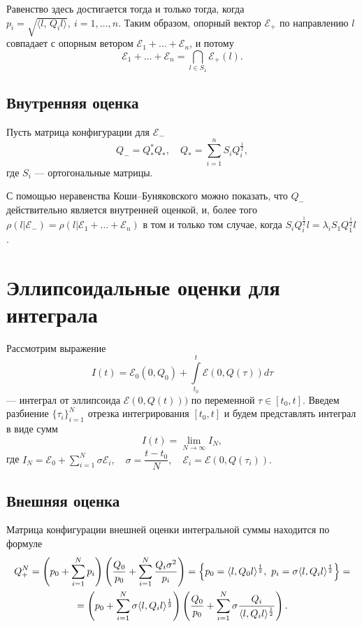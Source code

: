 \documentclass[16pt]{article}
\newcommand\Sum[2]{\sum\limits_{#1}^{#2}}
\newcommand\Scal[2]{\langle #1,\, #2 \rangle}
\begin{document}
Равенство здесь достигается тогда и только тогда, когда $p_i = \sqrt{\Scal{l}{Q_il}},\ i = 1, \ldots, n$. Таким образом, опорный вектор $\mathcal{E}_+$ по направлению $l$ совпадает с опорным ветором $\mathcal{E}_1 + \ldots + \mathcal{E}_n$, и потому
$$ \mathcal{E}_1 + \ldots + \mathcal{E}_n = \bigcap_{l \in S_1} \mathcal{E}_+(l).$$

\subsection{Внутренняя оценка}

Пусть матрица конфигурации для $\mathcal{E}_-$
$$Q_- = Q_*^*Q_*, \quad Q_* = \Sum{i=1}{n}S_iQ_i^\frac12,$$
где $S_i$ --- ортогональные матрицы.

С помощью неравенства Коши--Буняковского можно показать, что $Q_-$ действительно является внутренней оценкой, и, более того $\rho(l|\mathcal{E}_-) = \rho(l|\mathcal{E}_1 + \ldots + \mathcal{E}_n)$ в том и только том случае, когда $S_iQ_i^\frac12l = \lambda_iS_1Q_1^\frac12l$.

\section{Эллипсоидальные оценки для интеграла}
Рассмотрим выражение 
$$I(t) = \mathcal{E}_0(0, Q_0) + \int\limits_{t_0}^{t}\mathcal{E}(0, Q(\tau))d\tau$$
--- интеграл от эллипсоида $\mathcal{E}(0, Q(t)))$ по переменной $\tau \in [t_0, t]$. Введем разбиение $\{\tau_i\}_{i = 1}^{N}$ отрезка интегрирования $[t_0, t]$ и будем представлять интеграл в виде сумм 
$$
I(t) = \lim\limits_{N \rightarrow \infty}I_N,
$$
где $I_N = \mathcal{E}_0 + \sum\limits_{i = 1}^{N}\sigma \mathcal{E}_i,\quad \sigma = \dfrac{t - t_0}{N}, \quad \mathcal{E}_{i} = \mathcal{E}(0, Q(\tau_i)).
$

\subsection{Внешняя оценка}
Матрица конфигурации внешней оценки интегральной суммы находится по формуле
\begin{multline}\notag
Q_+^N = \left( p_0 + \sum\limits_{i = 1}^{N}p_i \right)\left( \dfrac{Q_0}{p_0} + \sum\limits_{i = 1}^{N} \dfrac{Q_i \sigma^2}{p_i}\right) = \left\{ p_0 = \langle l, Q_0 l \rangle ^{\frac{1}{2}},\ p_i = \sigma \langle l, Q_i l \rangle ^{\frac{1}{2}}\right\} =\\
= \left( p_0 + \sum\limits_{i = 1}^{N}\sigma\langle l, Q_il\rangle^{\frac{1}{2}} \right)\left( \dfrac{Q_0}{p_0} + \sum\limits_{i = 1}^{N} \sigma \dfrac{Q_i}{\langle l, Q_il\rangle^{\frac{1}{2}}}\right).
\end{multline}
\end{document}
